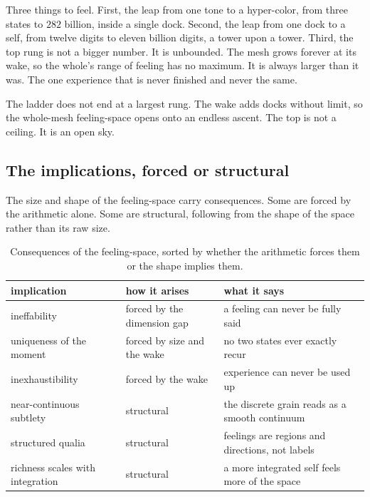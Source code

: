 Three things to feel. First, the leap from one tone to a hyper-color, from three states to $282$ billion, inside a single dock. Second, the leap from one dock to a self, from twelve digits to eleven billion digits, a tower upon a tower. Third, the top rung is not a bigger number. It is unbounded. The mesh grows forever at its wake, so the whole's range of feeling has no maximum. It is always larger than it was. The one experience that is never finished and never the same.

\begin{principle}
The ladder does not end at a largest rung. The wake adds docks without limit, so the whole-mesh feeling-space opens onto an endless ascent. The top is not a ceiling. It is an open sky.
\end{principle}

\subsection{The implications, forced or structural}

The size and shape of the feeling-space carry consequences. Some are forced by the arithmetic alone. Some are structural, following from the shape of the space rather than its raw size.

\begin{table}[ht]
\centering
\begin{tabular}{@{}llp{}@{}}
\toprule
implication & how it arises & what it says \\
\midrule
ineffability & forced by the dimension gap & a feeling can never be fully said \\
uniqueness of the moment & forced by size and the wake & no two states ever exactly recur \\
inexhaustibility & forced by the wake & experience can never be used up \\
near-continuous subtlety & structural & the discrete grain reads as a smooth continuum \\
structured qualia & structural & feelings are regions and directions, not labels \\
richness scales with integration & structural & a more integrated self feels more of the space \\
\bottomrule
\end{tabular}
\caption{Consequences of the feeling-space, sorted by whether the arithmetic forces them or the shape implies them.}
\label{tab:implications}
\end{table}

